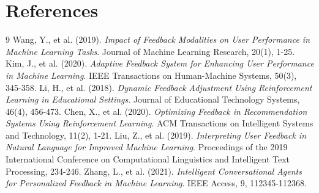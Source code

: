 \documentclass{article}
\begin{document}
\section*{References}
\begin{thebibliography}{9}
 Wang, Y., et al. (2019). \emph{Impact of Feedback Modalities on User Performance in Machine Learning Tasks}. Journal of Machine Learning Research, 20(1), 1-25.
 Kim, J., et al. (2020). \emph{Adaptive Feedback System for Enhancing User Performance in Machine Learning}. IEEE Transactions on Human-Machine Systems, 50(3), 345-358.
 Li, H., et al. (2018). \emph{Dynamic Feedback Adjustment Using Reinforcement Learning in Educational Settings}. Journal of Educational Technology Systems, 46(4), 456-473.
 Chen, X., et al. (2020). \emph{Optimizing Feedback in Recommendation Systems Using Reinforcement Learning}. ACM Transactions on Intelligent Systems and Technology, 11(2), 1-21.
 Liu, Z., et al. (2019). \emph{Interpreting User Feedback in Natural Language for Improved Machine Learning}. Proceedings of the 2019 International Conference on Computational Linguistics and Intelligent Text Processing, 234-246.
 Zhang, L., et al. (2021). \emph{Intelligent Conversational Agents for Personalized Feedback in Machine Learning}. IEEE Access, 9, 112345-112368.
\end{thebibliography}
\end{document}
